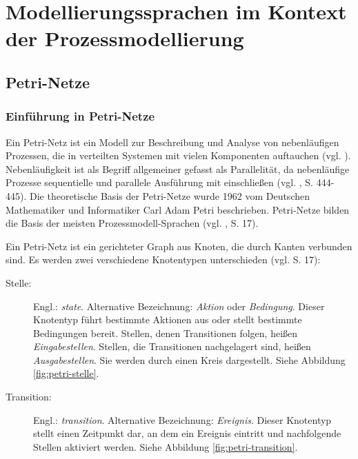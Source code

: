 \chapter{Modellierungssprachen im Kontext der Prozessmodellierung}\label{mod-petri}

\section{Petri-Netze}

\subsection{Einführung in Petri-Netze}
Ein Petri-Netz ist ein Modell zur Beschreibung und Analyse von nebenläufigen Prozessen, die in verteilten Systemen mit vielen Komponenten auftauchen (vgl. \citep{PetriReisig2008}). Nebenläufigkeit ist als Begriff allgemeiner gefasst als Parallelität, da nebenläufige Prozesse sequentielle und parallele Ausführung mit einschließen (vgl. \citep{ClausSchwill2006}, S. 444-445). Die theoretische Basis der Petri-Netze wurde 1962 vom Deutschen Mathematiker und Informatiker Carl Adam Petri beschrieben. Petri-Netze bilden die Basis der meisten Prozessmodell-Sprachen (vgl. \citep{BernroiderStix2006}, S. 17).

Ein Petri-Netz ist ein gerichteter Graph aus Knoten, die durch Kanten verbunden sind. Es werden zwei verschiedene Knotentypen unterschieden (vgl. \citep{BernroiderStix2006} S. 17):

\begin{description}
\item[Stelle:] Engl.: \emph{state}. Alternative Bezeichnung: \emph{Aktion} oder \emph{Bedingung}. Dieser Knotentyp führt bestimmte Aktionen aus oder stellt bestimmte Bedingungen bereit. Stellen, denen Transitionen folgen, heißen \emph{Eingabestellen}. Stellen, die Transitionen nachgelagert sind, heißen \emph{Ausgabestellen}. Sie werden durch einen Kreis dargestellt. Siehe Abbildung \ref{fig:petri-stelle}.

\item[Transition:] Engl.: \emph{transition}. Alternative Bezeichnung: \emph{Ereignis}. Dieser Knotentyp stellt einen Zeitpunkt dar, an dem ein Ereignis eintritt und nachfolgende Stellen aktiviert werden. Siehe Abbildung \ref{fig:petri-transition}.
\end{description}

